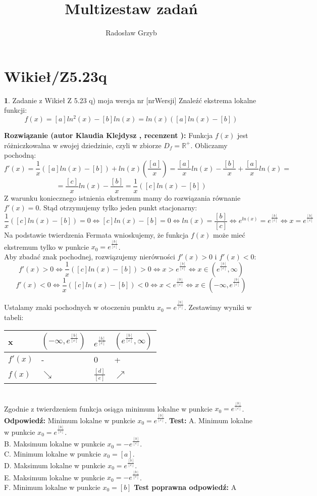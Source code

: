 \documentclass[12pt, a4paper]{article}
\title{Multizestaw zadań}
\author{Radosław Grzyb}
\date{}
\theoremstyle{definition} %
\newtheorem{zad}{}
\newcommand{\kategoria}[1]{\section{#1}} %
\newcommand{\zadStart}[1]{\begin{zad}#1\newline} %
\newcommand{\zadStop}{\end{zad}}   %
\newcommand{\rozwStart}[2]{\noindent \textbf{Rozwiązanie (autor #1 , recenzent #2): }\newline} %
\newcommand{\rozwStop}{\newline}                                            %
\newcommand{\odpStart}{\noindent \textbf{Odpowiedź:}\newline}    %
\newcommand{\odpStop}{\newline}                                             %
\newcommand{\testStart}{\noindent \textbf{Test:}\newline} %
\newcommand{\testStop}{\newline} %
\newcommand{\kluczStart}{\noindent \textbf{Test poprawna odpowiedź:}\newline} %
\newcommand{\kluczStop}{\newline} %
\begin{document}
\maketitle


\kategoria{Wikieł/Z5.23q}
\zadStart{Zadanie z Wikieł Z 5.23 q) moja wersja nr [nrWersji]}
Znaleźć ekstrema lokalne funkcji:
$$f(x)=[a]ln^2(x)-[b]ln(x)=ln(x)([a]ln(x)-[b])$$
\zadStop
\rozwStart{Klaudia Klejdysz}{}
Funkcja $f(x)$ jest różniczkowalna w swojej dziedzinie, czyli w zbiorze $D_f=\mathbb{R}^{+}$. Obliczamy pochodną:
$$f'(x)=\frac{1}{x}([a]ln(x)-[b])+ln(x)(\frac{[a]}{x})=\frac{[a]}{x}ln(x)-\frac{[b]}{x}+\frac{[a]}{x}ln(x)=$$
$$=\frac{[c]}{x}ln(x)-\frac{[b]}{x}=\frac{1}{x}([c]ln(x)-[b])$$
\noindent Z warunku koniecznego istnienia ekstremum mamy do rozwiązania równanie $f'(x)=0$. Stąd otrzymujemy tylko jeden punkt stacjonarny:
$$\frac{1}{x}([c]ln(x)-[b])=0\Leftrightarrow[c]ln(x)-[b]=0\Leftrightarrow ln(x)=\frac{[b]}{[c]}\Leftrightarrow e^{ln(x)}=e^{\frac{[b]}{[c]}}\Leftrightarrow x=e^{\frac{[b]}{[c]}}$$
Na podstawie twierdzenia Fermata wnioskujemy, że funkcja $f(x)$ może mieć ekstremum tylko w punkcie $x_0=e^{\frac{[b]}{[c]}}$.\\
Aby zbadać znak pochodnej, rozwiązujemy nierówności $f'(x)>0$ i $f'(x)<0$:
$$f'(x)>0\Leftrightarrow\frac{1}{x}([c]ln(x)-[b])>0\Leftrightarrow x>e^{\frac{[b]}{[c]}}\Leftrightarrow x\in(e^{\frac{[b]}{[c]}},\infty)$$
$$f'(x)<0\Leftrightarrow\frac{1}{x}([c]ln(x)-[b])<0\Leftrightarrow x<e^{\frac{[b]}{[c]}}\Leftrightarrow x\in(-\infty,e^{\frac{[b]}{[c]}})$$

\noindent Ustalamy znaki pochodnych w otoczeniu punktu $x_0=e^{\frac{[b]}{[c]}}$. Zestawimy wyniki w tabeli:
\begin{table}[h]
\centering
\begin{tabular}{|l|l|l|l|}
\hline
x     & $(-\infty,e^{\frac{[b]}{[c]}})$ & $e^{\frac{[b]}{[c]}}$ & $(e^{\frac{[b]}{[c]}},\infty)$ \\ \hline
$f'(x)$ & -                          & 0 & +                         \\ \hline
$f(x)$  & $\searrow$    & $\frac{[d]}{[e]}$ & $\nearrow$   \\ \hline
\end{tabular}
\end{table}\\
Zgodnie z twierdzeniem funkcja osiąga minimum lokalne w punkcie $x_0=e^{\frac{[b]}{[c]}}$.
\rozwStop
\odpStart
Minimum lokalne w punkcie $x_0=e^{\frac{[b]}{[c]}}$.
\odpStop
\testStart
A. Minimum lokalne w punkcie $x_0=e^{\frac{[b]}{[c]}}$.\\
B. Maksimum lokalne w punkcie $x_0=-e^{\frac{[b]}{[c]}}$.\\
C. Minimum lokalne w punkcie $x_0=[a]$.\\
D. Maksimum lokalne w punkcie $x_0=e^{\frac{[b]}{[c]}}$.\\
E. Maksimum lokalne w punkcie $x_0=-e^{\frac{[b]}{[c]}}$.\\
F. Minimum lokalne w punkcie $x_0=[b]$
\testStop
\kluczStart
A
\kluczStop
\end{document}
